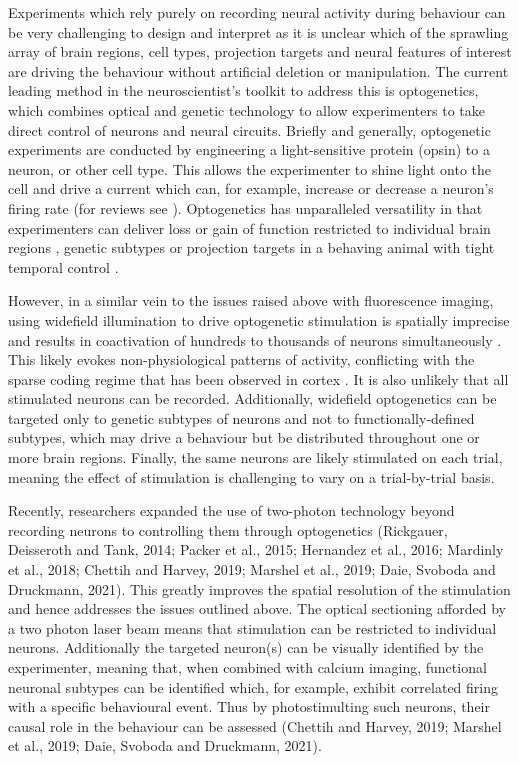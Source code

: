 Experiments which rely purely on recording neural activity during behaviour can be very challenging to design and interpret as it is unclear which of the sprawling array of brain regions, cell types, projection targets and neural features of interest are driving the behaviour without artificial deletion or manipulation. The current leading method in the neuroscientist’s toolkit to address this is optogenetics, which combines optical and genetic technology to allow experimenters to take direct control of neurons and neural circuits. Briefly and generally, optogenetic experiments are conducted by engineering a light-sensitive protein (opsin) to a neuron, or other cell type. This allows the experimenter to shine light onto the cell and drive a current which can, for example, increase or decrease a neuron's firing rate (for reviews see \cite{miesenbock_optogenetic_2009, deisseroth_optogenetics_2011}). Optogenetics has unparalleled versatility in that experimenters can deliver loss or gain of function restricted to individual brain regions \cite{zhang_optogenetic_2010}, genetic subtypes \cite{cardin_driving_2009, tye_dopamine_2013, zalocusky_nucleus_2016} or projection targets \cite{mattis_frequency-dependent_2014} in a behaving animal \cite{tye_amygdala_2011} with tight temporal control \cite{krook-magnuson_-demand_2013}. 

However, in a similar vein to the issues raised above with fluorescence imaging, using widefield illumination to drive optogenetic stimulation is spatially imprecise and results in coactivation of hundreds to thousands of neurons simultaneously \cite{huber_sparse_2008}. This likely evokes non-physiological patterns of activity, conflicting with the sparse coding regime that has been observed in cortex \cite{olshausen_sparse_2004}. It is also unlikely that all stimulated neurons can be recorded. Additionally, widefield optogenetics can be targeted only to genetic subtypes of neurons and not to functionally-defined subtypes, which may drive a behaviour but be distributed throughout one or more brain regions.  Finally, the same neurons are likely stimulated on each trial, meaning the effect of stimulation is challenging to vary on a trial-by-trial basis.

Recently, researchers expanded the use of two-photon technology beyond recording neurons to controlling them through optogenetics (Rickgauer, Deisseroth and Tank, 2014; Packer et al., 2015; Hernandez et al., 2016; Mardinly et al., 2018; Chettih and Harvey, 2019; Marshel et al., 2019; Daie, Svoboda and Druckmann, 2021). This greatly improves the spatial resolution of the stimulation and hence addresses the issues outlined above. The optical sectioning afforded by a two photon laser beam means that stimulation can be restricted to individual neurons. Additionally the targeted neuron(s) can be visually identified by the experimenter, meaning that, when combined with calcium imaging, functional neuronal subtypes can be identified which, for example, exhibit correlated firing with a specific behavioural event. Thus by photostimulting such neurons, their causal role in the behaviour can be assessed (Chettih and Harvey, 2019; Marshel et al., 2019; Daie, Svoboda and Druckmann, 2021).

